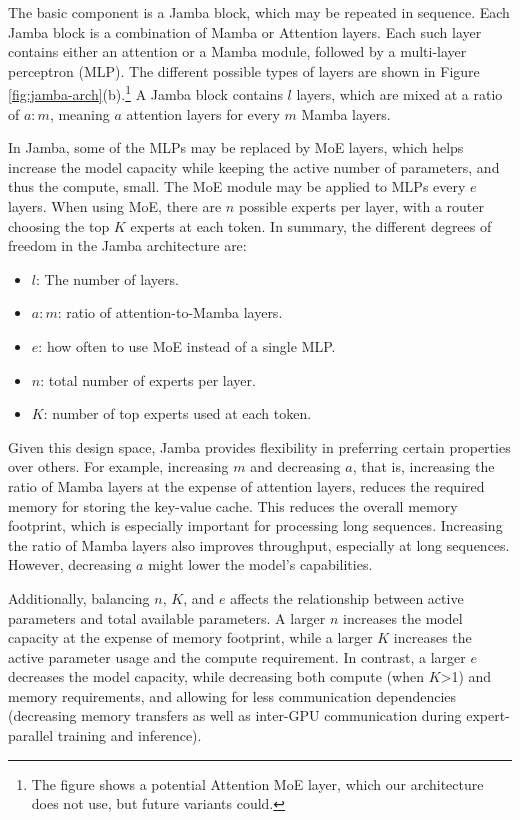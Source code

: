 \documentclass{article}
\begin{document}
The basic component is a Jamba block, which may be repeated in sequence. Each Jamba block is a combination of Mamba or Attention layers. Each such layer contains either an attention or a Mamba module, followed by a multi-layer perceptron (MLP). The different possible types of layers are shown in Figure \ref{fig:jamba-arch}(b).\footnote{The figure shows a potential Attention MoE layer, which our architecture does not use, but future variants could.} A Jamba block contains $l$ layers, which are mixed at a ratio of $a:m$, meaning $a$ attention layers for every $m$ Mamba layers. 

In Jamba, some of the MLPs may be replaced by MoE layers, which helps increase the model capacity while keeping the active number of parameters, and thus the compute, small. The MoE module may be applied to MLPs every $e$ layers. When using MoE, there are $n$ possible experts per layer, with a router choosing the top $K$ experts at each token.
In summary, the different degrees of freedom in the Jamba architecture are:
\begin{itemize}
\item $l$: The number of layers.
\item $a:m$: ratio of attention-to-Mamba layers.
\item $e$: how often to use MoE instead of a single MLP.     
\item $n$: total number of experts per layer. 
\item $K$: number of top experts used at each token. 
\end{itemize}

Given this design space, Jamba provides  flexibility in preferring certain properties over others. For example, increasing $m$ and decreasing $a$, that is, increasing the ratio of Mamba layers at the expense of attention layers, reduces the required memory for storing the key-value cache. This reduces the overall memory footprint, which is especially important for processing long sequences. Increasing the ratio of Mamba layers also improves throughput, especially at long sequences. However, decreasing $a$ might lower the model’s capabilities. 

Additionally, balancing $n$, $K$, and $e$ affects the relationship between active parameters and total available parameters. A larger $n$ increases the model capacity at the expense of memory footprint, while a larger $K$ increases the active parameter usage and the compute requirement. In contrast, a larger $e$ decreases the model capacity, while decreasing both compute (when $K$>1) and memory requirements, and allowing for less communication dependencies (decreasing memory transfers as well as inter-GPU communication during expert-parallel training and inference).
\end{document}
